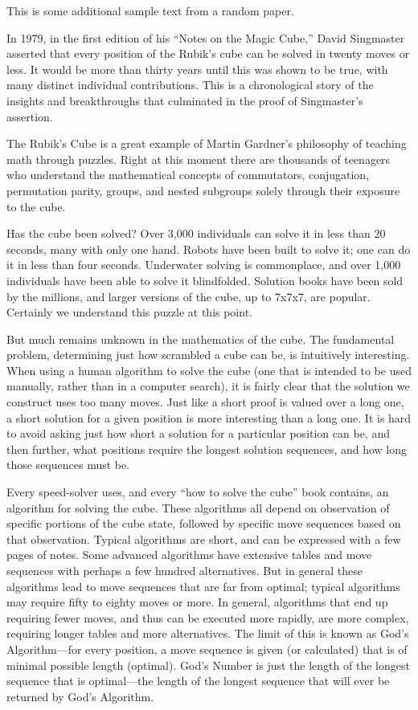 This is some additional sample text from a random paper.

In 1979, in the first edition of his ``Notes on the Magic
Cube,''
David Singmaster asserted that every position of the Rubik's cube
can be solved in twenty moves or less.  It would be more than
thirty years until this was shown to be true, with many distinct
individual contributions.  This is a chronological story of the
insights and breakthroughs that culminated in the proof of
Singmaster's assertion.

The Rubik's Cube is a great example of Martin Gardner's philosophy
of teaching math through puzzles.  Right at this moment there are
thousands of teenagers who understand the mathematical concepts of
commutators, conjugation, permutation parity, groups, and nested
subgroups solely through their exposure to the cube.

Has the cube been solved?  Over 3,000 individuals can solve it in
less than 20 seconds, many with only one hand.  Robots have been
built to solve it; one can do it in less than four seconds.
Underwater solving is commonplace, and over 1,000 individuals
have been able to solve it blindfolded.  Solution books have been
sold by the millions, and larger versions of the cube, up to 7x7x7,
are popular.  Certainly we understand this puzzle at this point.

But much remains unknown in the mathematics of the cube.
The fundamental problem, determining just how scrambled a cube can
be, is intuitively interesting.  When using a human algorithm
to solve the cube (one that is intended to be used manually,
rather than in a computer search), it is fairly clear that the solution
we construct uses too many moves.  Just like a short proof is valued
over a long one, a short solution for a given position is more
interesting than a long one.  It is hard to avoid asking just how
short a solution for a particular position can be, and then further,
what positions require the longest solution sequences, and how long those
sequences must be.

Every speed-solver uses, and every ``how to solve the cube'' book
contains, an algorithm for solving the cube.  These algorithms all
depend on observation of specific portions of the cube state,
followed by specific move sequences based on that observation.
Typical algorithms are short, and can be expressed with a few pages
of notes.  Some advanced algorithms have extensive tables and move
sequences with perhaps a few hundred alternatives.  But in general
these algorithms lead to move sequences that are far from optimal;
typical algorithms may require fifty to eighty moves or more.  In
general, algorithms that end up requiring fewer moves, and thus can
be executed more rapidly, are more complex, requiring longer tables
and more alternatives.  The limit of this is known as God's
Algorithm---for every position, a move sequence is given (or
calculated) that is of minimal possible length (optimal).  God's
Number is just the length of the longest sequence that is optimal---the
length of the longest sequence that will ever be returned by God's
Algorithm.

